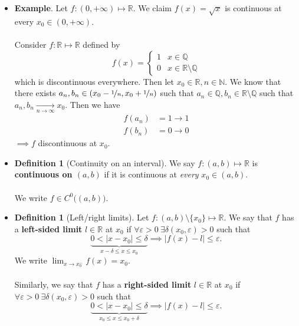\documentclass{article}
\newcommand{\Q}{\mathbb{Q}}
\newcommand{\R}{\mathbb{R}}
\newcommand{\N}{\mathbb{N}}
\newcommand{\?}{\stackrel{?}{=}}
\theoremstyle{definition} %
\newtheorem{definition}[theorem]{Definition} %
\begin{document}
\begin{itemize}
    \item \textbf{Example}. Let $f: (0, +\infty) \mapsto \R$. We claim $f(x) = \sqrt{x}$ is continuous at every $x_0 \in (0, +\infty)$. \\\\
          Consider $f: \R \mapsto \R$ defined by
          \[
              f(x) =
              \begin{cases}
                  1 & x \in \Q              \\
                  0 & x \in \R \setminus \Q
              \end{cases}
          \]
          which is discontinuous everywhere. Then let $x_0 \in \R, n \in \N$. We know that there exists $a_n, b_n \in (x_0 - \nicefrac{1}{n}, x_0 + \nicefrac{1}{n})$ such that $a_n \in \Q, b_n \in \R \setminus \Q$ such that $a_n, b_n \underset{n \rightarrow \infty}{\longrightarrow} x_0$. Then we have
          \begin{align*}
              f(a_n) & = 1 \rightarrow 1 \\
              f(b_n) & = 0 \rightarrow 0
          \end{align*}
          $\implies f$ discontinuous at $x_0$.
    \item[]
          \begin{definition}[Continuity on an interval]
              We say $f: (a, b) \mapsto \R$ is \textbf{continuous on $(a, b)$} if it is continuous at \textit{every} $x_0 \in (a, b)$. \\\\
              We write $f \in C^0 \big((a, b)\big)$.
          \end{definition}
    \item[]
          \begin{definition}[Left/right limits]
              Let $f: (a, b) \setminus \{x_0\} \mapsto \R$. We say that $f$ has a \textbf{left-sided limit} $l \in \R$ at $x_0$ if $\forall \varepsilon > 0 \ \exists \delta(x_0, \varepsilon) > 0$ such that
              $$\underbrace{0 < |x - x_0| \leq \delta}_{x - \delta \leq x \leq x_0} \implies |f(x) - l| \leq \varepsilon.$$
              We write $\lim_{x \to x_0^-} f(x) = x_0$. \\\\
              Similarly, we say that $f$ has a \textbf{right-sided limit} $l \in \R$ at $x_0$ if $\forall \varepsilon > 0 \ \exists \delta(x_0, \varepsilon) > 0$ such that
              $$\underbrace{0 < |x - x_0| \leq \delta}_{x_0 \leq x \leq x_0 + \delta} \implies |f(x) - l| \leq \varepsilon.$$

\end{definition}
\end{itemize}
\end{document}
